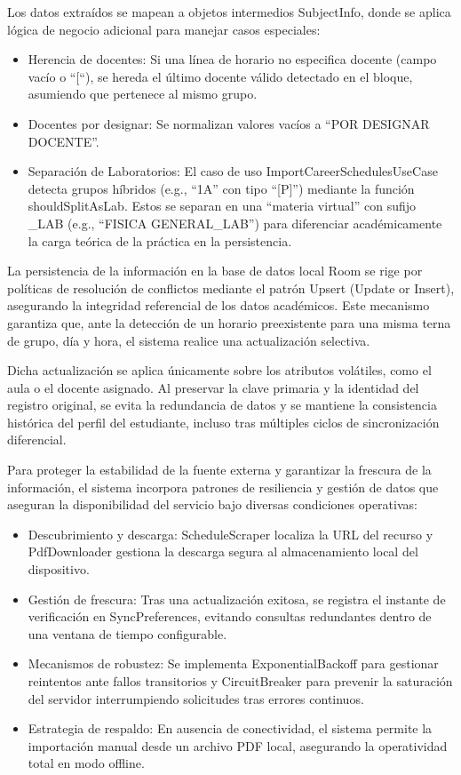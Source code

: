 Los datos extraídos se mapean a objetos intermedios SubjectInfo, donde se aplica lógica de negocio adicional para manejar casos especiales:
\begin{itemize}
    \item Herencia de docentes: Si una línea de horario no especifica docente (campo vacío o ``[``), se hereda el último docente válido detectado en el bloque, asumiendo que pertenece al mismo grupo.
    \item Docentes por designar: Se normalizan valores vacíos a ``POR DESIGNAR DOCENTE''.
    \item Separación de Laboratorios: El caso de uso ImportCareerSchedulesUseCase detecta grupos híbridos (e.g., ``1A'' con tipo ``[P]'') mediante la función shouldSplitAsLab. Estos se separan en una ``materia virtual'' con sufijo \_LAB (e.g., ``FISICA GENERAL\_LAB'') para diferenciar académicamente la carga teórica de la práctica en la persistencia.
\end{itemize}

La persistencia de la información en la base de datos local Room se rige por políticas de resolución de conflictos mediante el patrón Upsert (Update or Insert), asegurando la integridad referencial de los datos académicos. Este mecanismo garantiza que, ante la detección de un horario preexistente para una misma terna de grupo, día y hora, el sistema realice una actualización selectiva.

Dicha actualización se aplica únicamente sobre los atributos volátiles, como el aula o el docente asignado. Al preservar la clave primaria y la identidad del registro original, se evita la redundancia de datos y se mantiene la consistencia histórica del perfil del estudiante, incluso tras múltiples ciclos de sincronización diferencial.

Para proteger la estabilidad de la fuente externa y garantizar la frescura de la información, el sistema incorpora patrones de resiliencia y gestión de datos que aseguran la disponibilidad del servicio bajo diversas condiciones operativas:

\begin{itemize}
  \item Descubrimiento y descarga: ScheduleScraper localiza la URL del recurso y PdfDownloader gestiona la descarga segura al almacenamiento local del dispositivo.
  \item Gestión de frescura: Tras una actualización exitosa, se registra el instante de verificación en SyncPreferences, evitando consultas redundantes dentro de una ventana de tiempo configurable.
  \item Mecanismos de robustez: Se implementa ExponentialBackoff para gestionar reintentos ante fallos transitorios y CircuitBreaker para prevenir la saturación del servidor interrumpiendo solicitudes tras errores continuos.
  \item Estrategia de respaldo: En ausencia de conectividad, el sistema permite la importación manual desde un archivo PDF local, asegurando la operatividad total en modo offline.
\end{itemize}

